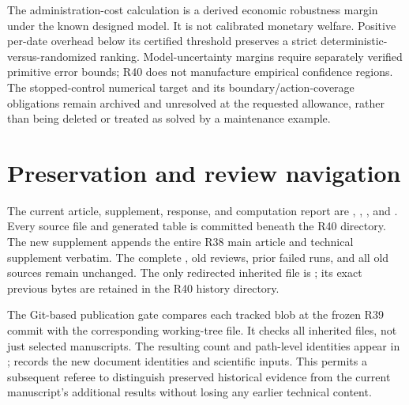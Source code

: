 The administration-cost calculation is a derived economic robustness margin under the known designed model. It is not calibrated monetary welfare. Positive per-date overhead below its certified threshold preserves a strict deterministic-versus-randomized ranking. Model-uncertainty margins require separately verified primitive error bounds; R40 does not manufacture empirical confidence regions. The stopped-control numerical target and its boundary/action-coverage obligations remain archived and unresolved at the requested allowance, rather than being deleted or treated as solved by a maintenance example.

\section{Preservation and review navigation}
The current article, supplement, response, and computation report are , , , and . Every source file and generated table is committed beneath the R40 directory. The new supplement appends the entire R38 main article and technical supplement verbatim. The complete , old reviews, prior failed runs, and all old sources remain unchanged. The only redirected inherited file is ; its exact previous bytes are retained in the R40 history directory.

The Git-based publication gate compares each tracked blob at the frozen R39 commit with the corresponding working-tree file. It checks all inherited files, not just selected manuscripts. The resulting count and path-level identities appear in ;  records the new document identities and scientific inputs. This permits a subsequent referee to distinguish preserved historical evidence from the current manuscript's additional results without losing any earlier technical content.

